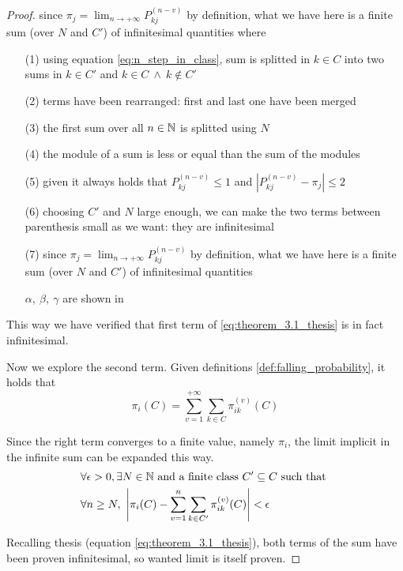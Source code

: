 \begin{proof}
		since $\pi_j = \lim_{n \to +\infty} P_{kj}^{(n-v)}$ by definition, what we have here is a finite sum (over $N$ and $C'$) of infinitesimal quantities
		where
		\begin{itemize}
			\item [(1)] using equation \eqref{eq:n_step_in_class}, sum is splitted in $k \in C$ into two sums in $k \in C'$ and $k \in C ~ \wedge ~ k \notin C' $
			\item [(2)] terms have been rearranged: first and last one have been merged
			\item [(3)] the first sum over all $n \in \mathbb{N}$ is splitted using $N$
			\item [(4)] the module of a sum is less or equal than the sum of the modules
			\item [(5)] given it always holds that $P_{kj}^{(n-v)} \le 1$ and $|P_{kj}^{(n-v)} - \pi_j| \le 2$
			\item [(6)] choosing $C'$ and $N$ large enough, we can make the two terms between parenthesis small as we want: they are infinitesimal
			\item [(7)] since $\pi_j = \lim_{n \to +\infty} P_{kj}^{(n-v)}$ by definition, what we have here is a finite sum (over $N$ and $C'$) of infinitesimal quantities
			\item[$\alpha, ~\beta,~ \gamma$] are shown in 
		\end{itemize}
		This way we have verified that first term of \eqref{eq:theorem_3.1_thesis} is in fact infinitesimal.

		\bigbreak
		Now we explore the second term.
		Given definitions \ref{def:falling_probability}, it holds that
		$$ \pi_i(C) = \sum_{v = 1}^{+\infty} \sum_{k \in C} \pi_{ik}^{(v)}(C) $$

		\smallbreak
		Since the right term converges to a finite value, namely $\pi_i$, the limit implicit in the infinite sum can be expanded this way.
		\begin{equation}\begin{split} \label{eq:pi_limit_definition}
			& \forall \epsilon > 0, \exists N \in \mathbb{N} \text{ and a finite class } C' \subseteq C \text{ such that } \\
			& \forall n \ge N,~ \left| \pi_i(C) - \sum_{v = 1}^{n} \sum_{k \in C'} \pi_{ik}^{(v)}(C) \right| < \epsilon
		\end{split}\end{equation}

		\bigbreak
		Recalling thesis (equation \eqref{eq:theorem_3.1_thesis}), both terms of the sum have been proven infinitesimal, so wanted limit is itself proven.
	\end{proof}

